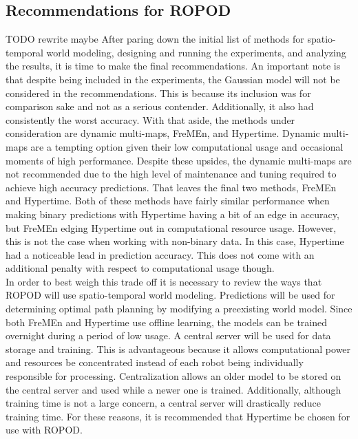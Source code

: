     \subsection{ Recommendations for ROPOD }

    TODO rewrite maybe
    After paring down the initial list of methods for spatio-temporal
    world modeling, designing and running the experiments, and analyzing the
    results, it is time to make the final recommendations. An important note
    is that despite being included in the experiments, the Gaussian model will
    not be considered in the recommendations. This is because its inclusion was
    for comparison sake and not as a serious contender. Additionally, it
    also had consistently the worst accuracy. With that aside, the methods
    under consideration are dynamic multi-maps, FreMEn, and Hypertime.
    Dynamic multi-maps are a tempting option given their low computational
    usage and occasional moments of high performance. Despite these upsides,
    the dynamic multi-maps are not recommended due to the high level of maintenance
    and tuning required to achieve high accuracy predictions. That leaves the
    final two methods, FreMEn and Hypertime. Both of these methods have fairly
    similar performance when making binary predictions with Hypertime having a
    bit of an edge in accuracy, but FreMEn edging Hypertime out in computational
    resource usage. However, this is not the case when working with non-binary
    data. In this case, Hypertime had a noticeable lead in prediction accuracy.
    This does not come with an additional penalty with respect to computational
    usage though. \\

    In order to best weigh this trade off it is necessary to review the ways
    that ROPOD will use spatio-temporal world modeling. Predictions will
    be used for determining optimal path planning by modifying a preexisting
    world model. Since both FreMEn and Hypertime use offline learning, the models
    can be trained overnight during a period of low usage. A central server
    will be used for data storage and training. This is advantageous because
    it allows computational power and resources be concentrated instead of each
    robot being individually responsible for processing. Centralization
    allows an older model to be stored on the central server and used
    while a newer one is trained. Additionally, although training time is not a large concern, a central server
    will drastically reduce training time. For
    these reasons, it is recommended that Hypertime be chosen for use with
    ROPOD. \\

